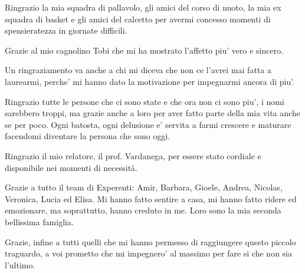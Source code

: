 Ringrazio la mia squadra di pallavolo, gli amici del corso di nuoto, la mia ex squadra di basket e gli amici del calcetto per avermi concesso momenti di spensieratezza in giornate difficili.

Grazie al mio cagnolino Tobi che mi ha mostrato l'affetto piu' vero e sincero.

Un ringraziamento va anche a chi mi diceva che non ce l'avrei mai fatta a laurearmi, perche' mi hanno dato la motivazione per impegnarmi ancora di piu'.

Ringrazio tutte le persone che ci sono state e che ora non ci sono piu', i nomi sarebbero troppi, ma grazie anche a loro per aver fatto parte della mia vita anche se per poco. Ogni batosta, ogni delusione e' servita a farmi crescere e maturare facendomi diventare la persona che sono oggi.

Ringrazio il mio relatore, il prof. Vardanega, per essere stato cordiale e disponibile nei momenti di necessità.

Grazie a tutto il team di Experenti: Amir, Barbara, Gioele, Andrea, Nicolas, Veronica, Lucia ed Elisa. Mi hanno fatto sentire a casa, mi hanno fatto ridere ed emozionare, ma soprattutto, hanno creduto in me.
Loro sono la mia seconda bellissima famiglia.

Grazie, infine a tutti quelli che mi hanno permesso di raggiungere questo piccolo traguardo, a voi prometto che mi impegnero' al massimo per fare si che non sia l'ultimo.